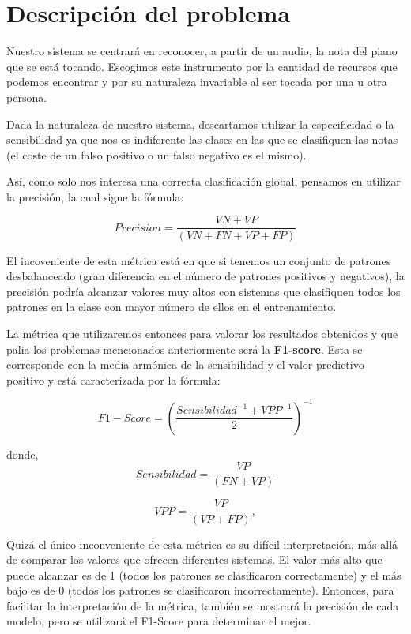 \documentclass[12pt]{article}
\begin{document}
\section{Descripción del problema}
\label{Descripción del problema}

Nuestro sistema se centrará en reconocer, a partir de un audio, la nota del piano que se está tocando. Escogimos este instrumento por la cantidad de recursos
que podemos encontrar y por su naturaleza invariable al ser tocada por una u otra persona.

\bigskip
Dada la naturaleza de nuestro sistema, descartamos utilizar la especificidad o la sensibilidad ya que nos es indiferente las clases en las que se clasifiquen
las notas (el coste de un falso positivo o un falso negativo es el mismo).

\bigskip
Así, como solo nos interesa una correcta clasificación global, pensamos en utilizar la precisión, la cual sigue la fórmula:

\begin{equation}
	Precision = \frac{VN + VP}{(VN + FN + VP + FP)}
\end{equation}

\smallskip
El incoveniente de esta métrica está en que si tenemos un conjunto de patrones desbalanceado (gran diferencia en el número de
patrones positivos y negativos), la precisión podría alcanzar valores muy altos con sistemas que clasifiquen todos los patrones en la clase con mayor número de ellos
en el entrenamiento.

\bigskip
La métrica que utilizaremos entonces para valorar los resultados obtenidos y que palia los problemas
mencionados anteriormente será la \textbf{F1-score}. Esta se corresponde con la media armónica de la sensibilidad y el
valor predictivo positivo y está caracterizada por la fórmula: 

\begin{equation}
	F1-Score = \left(\frac{Sensibilidad^{-1} + VPP^{-1}}{2}\right)^{-1}
\end{equation}

donde, 
\begin{equation}
	Sensibilidad = \frac{VP}{(FN + VP)}
\end{equation}

\begin{equation}
	VPP = \frac{VP}{(VP + FP)}, 
\end{equation}

\smallskip
Quizá el único inconveniente de esta métrica es su difícil interpretación, más allá de comparar los valores que ofrecen diferentes sistemas.
El valor más alto que puede alcanzar es de 1 (todos los patrones se clasificaron correctamente) y el más bajo es de 0 (todos los patrones se clasificaron
incorrectamente). Entonces, para facilitar la interpretación de la métrica, también se mostrará la precisión de cada modelo, pero se utilizará
el F1-Score para determinar el mejor.
\end{document}
